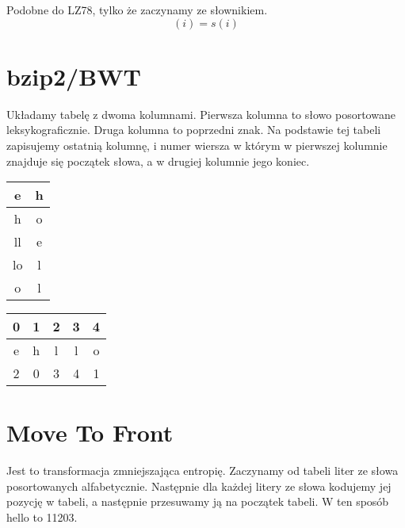 \documentclass{../notatki}
\begin{document}
\begin{multicols}{2}
  Podobne do LZ78, tylko że zaczynamy ze słownikiem.
  $$
  (i) = s(i)
  $$

  \section{bzip2/BWT}

  Układamy tabelę z dwoma kolumnami. Pierwsza kolumna to słowo posortowane
  leksykograficznie. Druga kolumna to poprzedni znak. Na podstawie tej tabeli
  zapisujemy ostatnią kolumnę, i numer wiersza w którym w pierwszej kolumnie
  znajduje się początek słowa, a w drugiej kolumnie jego koniec.

  \begin{center}

    \begin{tabular}{|c|c|}
      \hline
      e & h \\
      \hline
      \rowcolor{gray!50}
      h & o \\
      \hline
      ll & e \\
      \hline
      lo & l \\
      \hline
      o & l \\
      \hline
    \end{tabular}
    \begin{tabular}{|c|c|c|c|c|}
      \hline
      \rowcolor{gray!50}
      0 & 1 & 2 & 3 & 4 \\
      \hline
      e & h & l & l & o \\
      \hline
      2 & 0 & 3 & 4 & 1 \\
      \hline
    \end{tabular}
  \end{center}

  \section{Move To Front}

  Jest to transformacja zmniejszająca entropię. Zaczynamy od tabeli liter
  ze słowa posortowanych alfabetycznie. Następnie dla każdej litery ze słowa
  kodujemy jej pozycję w tabeli, a następnie przesuwamy ją na początek
  tabeli. W ten sposób hello to 11203.

\end{multicols}
\end{document}
